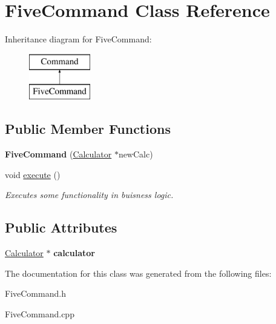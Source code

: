 \hypertarget{class_five_command}{}\section{Five\+Command Class Reference}
\label{class_five_command}
Inheritance diagram for Five\+Command\+:\begin{figure}[H]
\begin{center}
\leavevmode
\includegraphics[height=2.000000cm]{class_five_command}
\end{center}
\end{figure}
\subsection*{Public Member Functions}
\begin{DoxyCompactItemize}
\item 
\hypertarget{class_five_command_a7c39ae9c28cfcc1419acc180215ba3ba}{}{\bfseries Five\+Command} (\hyperlink{class_calculator}{Calculator} $\ast$new\+Calc)\label{class_five_command_a7c39ae9c28cfcc1419acc180215ba3ba}

\item 
\hypertarget{class_five_command_a97cbe6f79a00cf03fc8af1dc527dc801}{}void \hyperlink{class_five_command_a97cbe6f79a00cf03fc8af1dc527dc801}{execute} ()\label{class_five_command_a97cbe6f79a00cf03fc8af1dc527dc801}

\begin{DoxyCompactList}\small\item\em Executes some functionality in buisness logic. \end{DoxyCompactList}\end{DoxyCompactItemize}
\subsection*{Public Attributes}
\begin{DoxyCompactItemize}
\item 
\hypertarget{class_five_command_a9c6694f2dff27fabf44a4bacdbb07d12}{}\hyperlink{class_calculator}{Calculator} $\ast$ {\bfseries calculator}\label{class_five_command_a9c6694f2dff27fabf44a4bacdbb07d12}

\end{DoxyCompactItemize}


The documentation for this class was generated from the following files\+:\begin{DoxyCompactItemize}
\item 
Five\+Command.\+h\item 
Five\+Command.\+cpp\end{DoxyCompactItemize}
